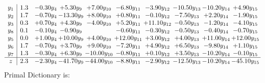 \documentclass[9pt]{article}
\begin{document}
\[\begin{array}{c| c c@{\hskip 2pt} c@{\hskip 2pt} c@{\hskip 2pt} c@{\hskip 2pt} c@{\hskip 2pt} c@{\hskip 2pt} c@{\hskip 2pt} c@{\hskip 2pt} }
 y_{1}   &  1.3 & -0.30 y_{4} & +  5.30 y_{9} & +  7.00 y_{10} & -6.80 y_{11} & -3.90 y_{12} & -10.50 y_{13} & -10.20 y_{14} & +  4.90 y_{15}\\
 y_{2}   &  1.7 & -0.70 y_{4} & -13.30 y_{9} & +  8.00 y_{10} & +  0.80 y_{11} & -0.10 y_{12} & -7.50 y_{13} & +  2.20 y_{14} & -1.90 y_{15}\\
 y_{3}   &  0.3 & +  0.70 y_{4} & +  4.30 y_{9} & -4.00 y_{10} & +  5.20 y_{11} & + 11.10 y_{12} & -0.50 y_{13} & -1.20 y_{14} & -4.10 y_{15}\\
 y_{8}   &  0.1 & -0.10 y_{4} & -0.90 y_{9} &   & -0.60 y_{11} & -0.30 y_{12} & -0.50 y_{13} & -0.40 y_{14} & -0.70 y_{15}\\
 y_{5}   &  0.0 & +  1.00 y_{4} & + 10.00 y_{9} & +  4.00 y_{10} & + 12.00 y_{11} & +  3.00 y_{12} & +  4.00 y_{13} & + 11.00 y_{14} & + 12.00 y_{15}\\
 y_{6}   &  1.7 & -0.70 y_{4} & +  3.70 y_{9} & +  9.00 y_{10} & -7.20 y_{11} & +  4.90 y_{12} & +  6.50 y_{13} & -9.80 y_{14} & +  1.10 y_{15}\\
 y_{7}   &  1.3 & -0.30 y_{4} & +  6.30 y_{9} & -10.00 y_{10} & -0.80 y_{11} & +  0.10 y_{12} & +  3.50 y_{13} & -10.20 y_{14} & -0.10 y_{15}\\
\hline
z    &  2.3 & -2.30 y_{4} & -41.70 y_{9} & -44.00 y_{10} & -8.80 y_{11} & -2.90 y_{12} & -12.50 y_{13} & -10.20 y_{14} & -45.10 y_{15}\\
\end{array}\]
Primal Dictionary is:
\end{document}
